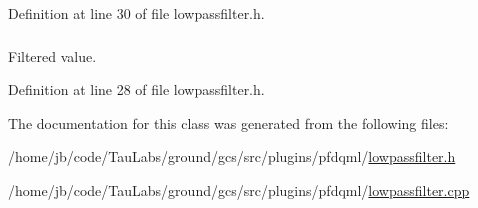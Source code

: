 \-Definition at line 30 of file lowpassfilter.\-h.

\hypertarget{class_low_pass_filter_abf649373a1b2f12fc6b6ffa4842dc2f7}{
\subsubsection[{value}]{}}\label{class_low_pass_filter_abf649373a1b2f12fc6b6ffa4842dc2f7}
\-Filtered value. 

\-Definition at line 28 of file lowpassfilter.\-h.



\-The documentation for this class was generated from the following files\-:\begin{DoxyCompactItemize}
\item 
/home/jb/code/\-Tau\-Labs/ground/gcs/src/plugins/pfdqml/\hyperlink{lowpassfilter_8h}{lowpassfilter.\-h}\item 
/home/jb/code/\-Tau\-Labs/ground/gcs/src/plugins/pfdqml/\hyperlink{lowpassfilter_8cpp}{lowpassfilter.\-cpp}\end{DoxyCompactItemize}
